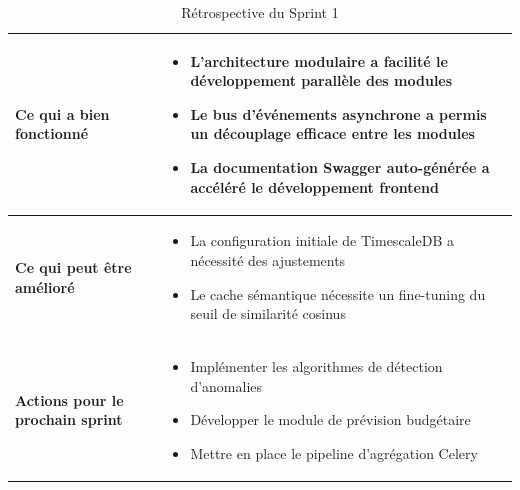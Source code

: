 \begin{table}[H]
\centering
\caption{Rétrospective du Sprint 1}
\label{tab:retro_s1}
\begin{tabularx}{\textwidth}{|l|X|}
\hline
\textbf{Ce qui a bien fonctionné} & \begin{minipage}[t]{\linewidth}\vspace{2pt}
\begin{itemize}[noitemsep,topsep=0pt]
\item L'architecture modulaire a facilité le développement parallèle des modules
\item Le bus d'événements asynchrone a permis un découplage efficace entre les modules
\item La documentation Swagger auto-générée a accéléré le développement frontend
\end{itemize}\vspace{2pt}
\end{minipage} \\
\hline
\textbf{Ce qui peut être amélioré} & \begin{minipage}[t]{\linewidth}\vspace{2pt}
\begin{itemize}[noitemsep,topsep=0pt]
\item La configuration initiale de TimescaleDB a nécessité des ajustements
\item Le cache sémantique nécessite un fine-tuning du seuil de similarité cosinus
\end{itemize}\vspace{2pt}
\end{minipage} \\
\hline
\textbf{Actions pour le prochain sprint} & \begin{minipage}[t]{\linewidth}\vspace{2pt}
\begin{itemize}[noitemsep,topsep=0pt]
\item Implémenter les algorithmes de détection d'anomalies
\item Développer le module de prévision budgétaire
\item Mettre en place le pipeline d'agrégation Celery
\end{itemize}\vspace{2pt}
\end{minipage} \\
\hline
\end{tabularx}
\end{table}

